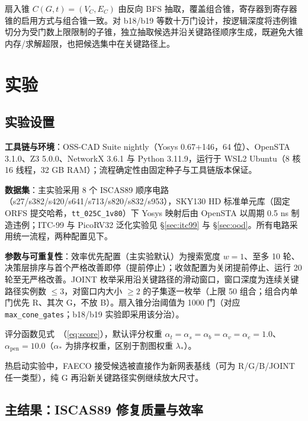 \documentclass[journal]{IEEEtran}
\renewcommand{\eqref}[1]{\textup{（\ref{#1}）}}
\begin{document}
扇入锥 $C(G, t) = (V_C, E_C)$ 由反向 BFS 抽取，覆盖组合锥，寄存器到寄存器锥的启用方式与组合锥一致。对 b18/b19 等数十万门设计，按逻辑深度将违例锥切分为受门数上限限制的子锥，独立抽取候选并沿关键路径顺序生成，既避免大锥内存/求解超限，也把候选集中在关键路径上。

\section{实验}\label{sec:exp}

\subsection{实验设置}\label{sec:setup}

\textbf{工具链与环境}：OSS-CAD Suite nightly（Yosys 0.67+146，64 位）、OpenSTA 3.1.0、Z3 5.0.0、NetworkX 3.6.1 与 Python 3.11.9，运行于 WSL2 Ubuntu（8 核 16 线程，32 GB RAM）；流程确定性由固定种子与工具链版本保证。

\textbf{数据集}：主实验采用 8 个 ISCAS89 顺序电路（s27/s382/s420/s641/s713/s820/s832/s953），SKY130 HD 标准单元库（固定 ORFS 提交哈希，\texttt{tt\_025C\_1v80}）下 Yosys 映射后由 OpenSTA 以周期 0.5 ns 制造违例；ITC-99 与 PicoRV32 泛化实验见 \S\ref{sec:itc99} 与 \S\ref{sec:ood}。所有电路采用统一流程，两种配置见下。

\textbf{参数与可重复性}：效率优先配置（主实验默认）为搜索宽度 $w=1$、至多 10 轮、决策层排序与首个严格改善即停（提前停止）；收敛配置为关闭提前停止、运行 20 轮至无严格改善。JOINT 枚举采用沿关键路径的滑动窗口，窗口深度为连续关键路径实例数 $\le 3$，对窗口内大小 $\ge 2$ 的子集逐一枚举（上限 50 组合；组合内单门优先 R、其次 G，不放 B）。扇入锥分治阈值为 1000 门（对应 \texttt{max\_cone\_gates}；b18/b19 实验即采用该分治）。

评分函数见式~\eqref{eq:score}，默认评分权重 $\alpha_t=\alpha_s=\alpha_b=\alpha_v=\alpha_e=1.0$、$\alpha_{\mathrm{pen}}=10.0$（$\alpha_*$ 为排序权重，区别于割图权重 $\lambda_*$）。

热启动实验中，FAECO 接受候选被直接作为新网表基线（可为 R/G/B/JOINT 任一类型），纯 G 再沿新关键路径实例继续放大尺寸。

\subsection{主结果：ISCAS89 修复质量与效率}\label{sec:iscas}
\end{document}
